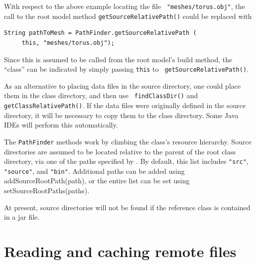 With respect to the above example locating the file {\tt
"meshes/torus.obj"}, the call to the root model method 
{\tt getSourceRelativePath()} could be replaced with
%
\begin{lstlisting}[]
  String pathToMesh = PathFinder.getSourceRelativePath (
     this, "meshes/torus.obj");
\end{lstlisting}
Since this is assumed to be called from the root model's build method,
the ``class'' can be indicated by simply passing {\tt this} to {\tt
getSourceRelativePath()}.

\begin{sideblock}
As an alternative to placing data files in the source directory, one
could place them in the class directory, and then use {\tt
findClassDir()} and {\tt getClassRelativePath()}. If the data files
were originally defined in the source directory, it will be necessary
to copy them to the class directory. Some Java IDEs will perform this
automatically.
\end{sideblock}

The {\tt PathFinder} methods work by climbing the class's resource
hierarchy.  Source directories are assumed to be located relative to
the parent of the root class directory, via one of the paths specified
by . By default, this
list includes {\tt "src"}, {\tt "source"}, and {\tt "bin"}. Additional
paths can be added using
%
{addSourceRootPath(path)},
or the entire list can be set using
%
{setSourceRootPaths(paths)}.

At present, source directories will not be found if the reference class
is contained in a jar file.

\section{Reading and caching remote files}
\label{FileManager:sec}


